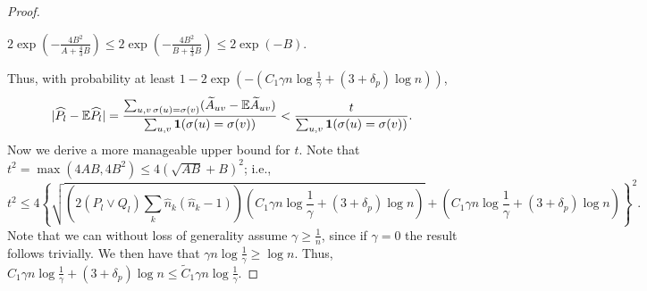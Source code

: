 \documentclass{article}
\begin{document}
\begin{proof}
\begin{enumerate}
       $2 \exp \left( - \frac{4 B^2}{A + \frac{4}{3} B} \right) \leq 2 \exp \left( - \frac{4 B^2}{ B + \frac{4}{3} B} \right) \leq 2 \exp( - B)$. 
\end{enumerate}
Thus, with probability at least $1- 2 \exp\left( -  \left(  C_1 \gamma n \log \frac{1}{\gamma} + (3+\delta_p) \log n \right) \right)$,
\begin{align*}
| \widehat{P}_l - {\mathbb E} \widehat{P}_l | =
\frac{\sum_{u,v \, \sigma(u) = \sigma(v)} (\widetilde{A}_{uv} - {\mathbb E} \widetilde{A}_{uv} ) }{
  \sum_{u,v} \mbox{\boldmath $1$}( \sigma(u) = \sigma(v) ) } &<
  \frac{t}{\sum_{u,v} \mbox{\boldmath $1$}(\sigma(u) = \sigma(v)) }. \\
\end{align*}
Now we derive a more manageable upper bound for $t$. Note that $t^2 = \max(4AB, 4B^2) \leq 4(\sqrt{AB} +B)^2$; i.e.,
\[
t^2 \leq 4 \left\{ \sqrt{  \left(2 (P_l \vee Q_l)  \sum_k \hat{n}_k (\hat{n}_k - 1) \right) 
               \left( C_1 \gamma n \log \frac{1}{\gamma} + (3+\delta_p) \log n \right)} 
           + 
          \left(   C_1 \gamma n \log \frac{1}{\gamma} + (3+\delta_p) \log n \right) \right\}^2.
\]
Note that we can without loss of generality assume $\gamma \geq \frac{1}{n}$, since if $\gamma = 0$ the result follows trivially. We then have that $\gamma n \log \frac{1}{\gamma} \geq \log n$. Thus, $ C_1\gamma n \log \frac{1}{\gamma} + (3 + \delta_p) \log n \leq \tilde C_1 \gamma n \log \frac{1}{\gamma}$.



\end{proof}
\end{document}
